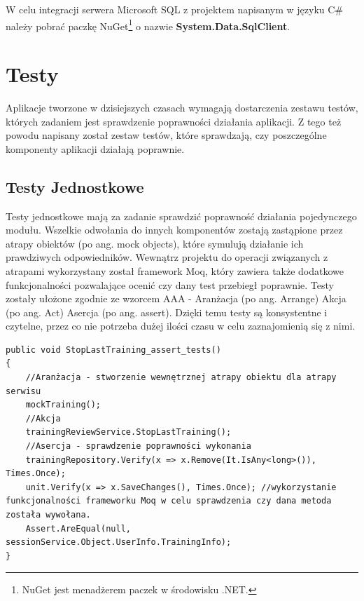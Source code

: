 W celu integracji serwera Microsoft SQL z projektem napisanym w języku C\# należy pobrać paczkę NuGet\footnote{NuGet jest menadżerem paczek w środowisku .NET.\cite{Nuget}} o nazwie \textbf{System.Data.SqlClient}.




\newpage
{\let\cleardoublepage\relax \chapter{Testy}}


Aplikacje tworzone w dzisiejszych czasach wymagają dostarczenia zestawu testów, których zadaniem jest sprawdzenie poprawności działania aplikacji. Z tego też powodu napisany został zestaw testów, które sprawdzają, czy poszczególne komponenty aplikacji działają poprawnie.

\section{Testy Jednostkowe}

Testy jednostkowe mają za zadanie sprawdzić poprawność działania pojedynczego modułu. Wszelkie odwołania do innych komponentów zostają zastąpione przez atrapy obiektów (po ang. mock objects), które symulują działanie ich prawdziwych odpowiedników.
 Wewnątrz projektu do operacji związanych z atrapami wykorzystany został framework Moq, który zawiera także dodatkowe funkcjonalności pozwalające ocenić czy dany test przebiegł poprawnie.
Testy zostały ułożone zgodnie ze wzorcem AAA\cite{UnitTestingMicrosoft} - Aranżacja (po ang. Arrange) Akcja (po ang. Act) Asercja (po ang. assert).  Dzięki temu testy są konsystentne i czytelne, przez co nie potrzeba dużej ilości czasu w celu zaznajomienią się z nimi.

\begin{lstlisting}[frame=single, numbers=none,captionpos=b, 
caption={Przykładowy test jednostkowy wykorzystujący wzorzec AAA}]
public void StopLastTraining_assert_tests()
{
	//Aranżacja - stworzenie wewnętrznej atrapy obiektu dla atrapy serwisu
	mockTraining();
	//Akcja
	trainingReviewService.StopLastTraining();
	//Asercja - sprawdzenie poprawności wykonania
	trainingRepository.Verify(x => x.Remove(It.IsAny<long>()), Times.Once);
	unit.Verify(x => x.SaveChanges(), Times.Once); //wykorzystanie funkcjonalności frameworku Moq w celu sprawdzenia czy dana metoda została wywołana.
	Assert.AreEqual(null, sessionService.Object.UserInfo.TrainingInfo);
}
\end{lstlisting}

